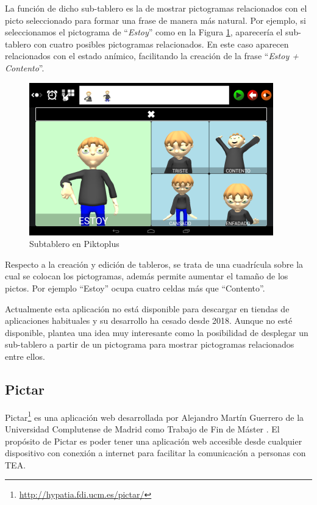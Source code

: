 La función de dicho sub-tablero es la de mostrar pictogramas relacionados con el picto seleccionado para formar una frase de manera más natural. Por ejemplo, si seleccionamos el pictograma de “\textit{Estoy}” como en la Figura  \ref{fig:piktoplus2}, aparecería el sub-tablero con cuatro posibles pictogramas relacionados. En este caso aparecen relacionados con el estado anímico, facilitando la creación de la frase “\textit{Estoy + Contento}”. 




\begin{figure}[h!]
	\centering
	\includegraphics[width=0.5\linewidth]{Imagenes/Bitmap/Piktoplus2}
	\caption[Subtablero Piktoplus]{Subtablero en Piktoplus}
	\label{fig:piktoplus2}
\end{figure}


Respecto a la creación y edición de tableros, se trata de una cuadrícula sobre la cual se colocan los pictogramas, además permite aumentar el tamaño de los pictos. Por ejemplo “Estoy” ocupa cuatro celdas más que “Contento”. 

Actualmente esta aplicación no está disponible para descargar en tiendas de aplicaciones  habituales y su desarrollo ha cesado desde 2018. Aunque no esté disponible, plantea una idea muy interesante como la posibilidad de desplegar un sub-tablero a partir de un pictograma para mostrar pictogramas relacionados entre ellos.

\subsection{Pictar}
Pictar\footnote{\url{http://hypatia.fdi.ucm.es/pictar/}} es una aplicación web desarrollada por Alejandro Martín Guerrero de la Universidad Complutense de Madrid como Trabajo de Fin de Máster \citep{TFMPictar}. El propósito de Pictar es poder tener una aplicación web accesible desde cualquier dispositivo con conexión a internet para facilitar la comunicación a personas con TEA.

